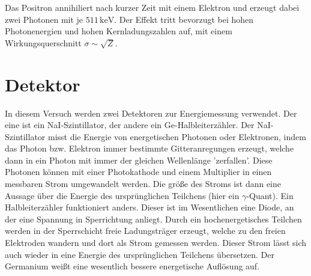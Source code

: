 Das Positron annihiliert nach kurzer Zeit mit einem Elektron und erzeugt dabei zwei Photonen mit je \( 511\,\text{keV} \). Der Effekt tritt bevorzugt bei hohen Photonenergien und hohen Kernladungszahlen auf, mit einem Wirkungsquerschnitt \( \sigma \sim \sqrt{Z} \).

\section{Detektor}
In diesem Versuch werden zwei Detektoren zur Energiemessung verwendet. Der eine ist ein NaI-Szintillator, der andere ein Ge-Halbleiterzähler. 
Der NaI-Szintillator misst die Energie von energetischen Photonen oder Elektronen, indem das Photon bzw. Elektron immer bestimmte Gitteranregungen erzeugt, welche dann in ein Photon mit immer der gleichen Wellenlänge 'zerfallen'. Diese Photonen können mit einer Photokathode und einem Multiplier in einen messbaren Strom umgewandelt werden. Die größe des Stroms ist dann eine Aussage über die Energie des ursprünglichen Teilchens (hier ein $\gamma$-Quant). 
Ein Halbleiterzähler funktioniert anders. Dieser ist im Wesentlichen eine Diode, an der eine Spannung in Sperrichtung anliegt. Durch ein hochenergetisches Teilchen werden in der Sperrschicht freie Ladungsträger erzeugt, welche zu den freien Elektroden wandern und dort als Strom gemessen werden. Dieser Strom lässt sich auch wieder in eine Energie des ursprünglichen Teilchens übersetzen. 
Der Germanium weißt eine wesentlich bessere energetische Auflösung auf.
